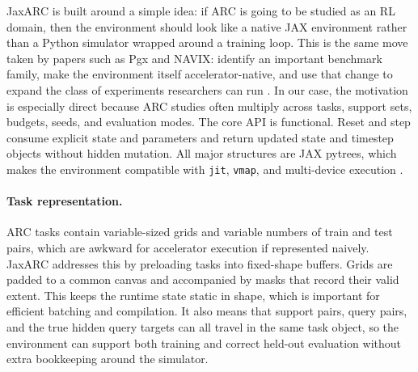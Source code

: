 %
%
%

JaxARC is built around a simple idea: if ARC is going to be studied as an RL domain, then the environment should look like a native JAX environment rather than a Python simulator wrapped around a training loop. This is the same move taken by papers such as Pgx and NAVIX: identify an important benchmark family, make the environment itself accelerator-native, and use that change to expand the class of experiments researchers can run \citep{koyamadaPgxHardwareAcceleratedParallel2023,pignatelliNAVIXScalingMiniGrid2025}. In our case, the motivation is especially direct because ARC studies often multiply across tasks, support sets, budgets, seeds, and evaluation modes. The core API is functional. Reset and step consume explicit state and parameters and return updated state and timestep objects without hidden mutation. All major structures are JAX pytrees, which makes the environment compatible with \texttt{jit}, \texttt{vmap}, and multi-device execution \citep{freemanBraxDifferentiablePhysics2021,bonnetJumanjiDiverseSuite2023}.

\paragraph{Task representation.} ARC tasks contain variable-sized grids and variable numbers of train and test pairs, which are awkward for accelerator execution if represented naively. JaxARC addresses this by preloading tasks into fixed-shape buffers. Grids are padded to a common canvas and accompanied by masks that record their valid extent. This keeps the runtime state static in shape, which is important for efficient batching and compilation. It also means that support pairs, query pairs, and the true hidden query targets can all travel in the same task object, so the environment can support both training and correct held-out evaluation without extra bookkeeping around the simulator.

